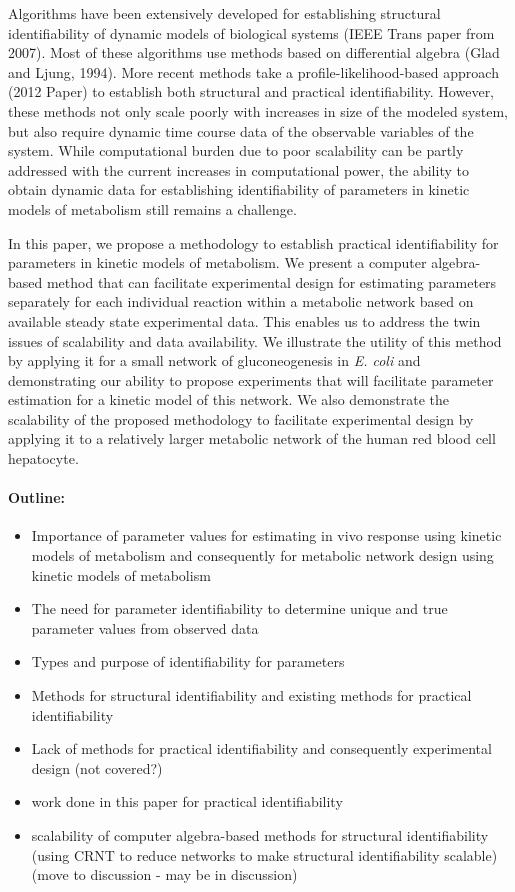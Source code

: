 \documentclass[10pt]{article}
\begin{document}
Algorithms have been extensively developed for establishing structural identifiability of dynamic models of biological systems (IEEE Trans paper from 2007). Most of these algorithms use methods based on differential algebra (Glad and Ljung, 1994). More recent methods take a profile-likelihood-based approach (2012 Paper) to establish both structural and practical identifiability. However, these methods not only scale poorly with increases in size of the modeled system, but also require dynamic time course data of the observable variables of the system. While computational burden due to poor scalability can be partly addressed with the current increases in computational power, the ability to obtain dynamic data for establishing identifiability of parameters in kinetic models of metabolism still remains a challenge. 

In this paper, we propose a methodology to establish practical identifiability for parameters in kinetic models of metabolism. We present a computer algebra-based method that can facilitate experimental design for estimating parameters separately for each individual reaction within a metabolic network based on available steady state experimental data. This enables us to address the twin issues of scalability and data availability. We illustrate the utility of this method by applying it for a small network of gluconeogenesis in \textit{E. coli} and demonstrating our ability to propose experiments that will facilitate parameter estimation for a kinetic model of this network. We also demonstrate the scalability of the proposed methodology to facilitate experimental design by applying it to a relatively larger metabolic network of the human red blood cell hepatocyte. 
	
\paragraph{Outline:}
\begin{itemize}
	\item Importance of parameter values for estimating in vivo response using kinetic models of metabolism and consequently for metabolic network design using kinetic models of metabolism
	\item The need for parameter identifiability to determine unique and true parameter values from observed data
	\item Types and purpose of identifiability for parameters
	\item Methods for structural identifiability and existing methods for practical identifiability
	\item Lack of methods for practical identifiability and consequently experimental design (not covered?)
	\item work done in this paper for practical identifiability			
	\item scalability of computer algebra-based methods for structural identifiability (using CRNT to reduce networks to make structural identifiability scalable) (move to discussion - may be in discussion)
\end{itemize}	
	
\end{document}

